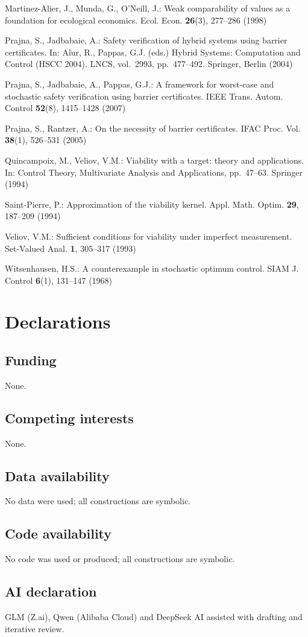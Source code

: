 \documentclass[11pt]{article}
\theoremstyle{definition}
\begin{document}
Martinez-Alier, J., Munda, G., O'Neill, J.: Weak comparability of values
as a foundation for ecological economics. Ecol. Econ. \textbf{26}(3),
277--286 (1998)

Prajna, S., Jadbabaie, A.: Safety verification of hybrid systems using
barrier certificates. In: Alur, R., Pappas, G.J. (eds.) Hybrid Systems:
Computation and Control (HSCC 2004). LNCS, vol.~2993, pp.~477--492.
Springer, Berlin (2004)

Prajna, S., Jadbabaie, A., Pappas, G.J.: A framework for worst-case and
stochastic safety verification using barrier certificates. IEEE Trans.
Autom. Control \textbf{52}(8), 1415--1428 (2007)

Prajna, S., Rantzer, A.: On the necessity of barrier certificates. IFAC
Proc. Vol. \textbf{38}(1), 526--531 (2005)

Quincampoix, M., Veliov, V.M.: Viability with a target: theory and
applications. In: Control Theory, Multivariate Analysis and
Applications, pp.~47--63. Springer (1994)

Saint-Pierre, P.: Approximation of the viability kernel. Appl. Math.
Optim. \textbf{29}, 187--209 (1994)

Veliov, V.M.: Sufficient conditions for viability under imperfect
measurement. Set-Valued Anal. \textbf{1}, 305--317 (1993)

Witsenhausen, H.S.: A counterexample in stochastic optimum control.
SIAM J. Control \textbf{6}(1), 131--147 (1968)

\section*{Declarations}

\subsection*{Funding}

None.

\subsection*{Competing interests}

None.

\subsection*{Data availability}

No data were used; all constructions are symbolic.

\subsection*{Code availability}

No code was used or produced; all constructions are symbolic.

\subsection*{AI declaration}
GLM (Z.ai), Qwen (Alibaba Cloud) and DeepSeek AI assisted with drafting and iterative review.
\end{document}
